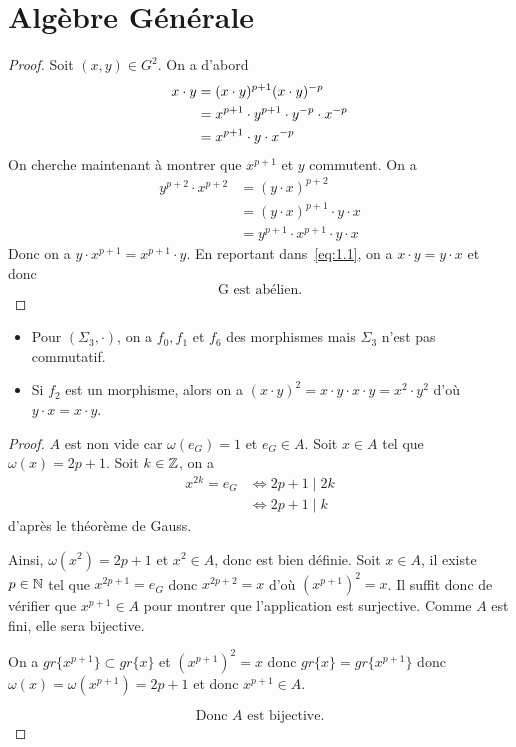 \section{Algèbre Générale}

\begin{proof}
	Soit $(x,y)\in G^{2}$. On a d'abord
	\begin{align}
		x\cdot y
		&=(x\cdot y)^{p+1}(x\cdot y)^{-p} \notag \\
		&=x^{p+1}\cdot y^{p+1}\cdot y^{-p}\cdot x^{-p}\notag \\
		&=x^{p+1}\cdot y \cdot x^{-p} \label{eq:1.1}
	\end{align}
	On cherche maintenant à montrer que $x^{p+1}$ et $y$ commutent.
	On a
	\begin{align}
		y^{p+2}\cdot x^{p+2}
		&=(y\cdot x)^{p+2}\\
		&=(y\cdot x)^{p+1}\cdot y\cdot x\\
		&=y^{p+1}\cdot x^{p+1}\cdot y\cdot x
	\end{align}
	Donc on a $y\cdot x^{p+1}=x^{p+1}\cdot y$. En reportant dans~\eqref{eq:1.1}, on a $x\cdot y=y\cdot x$ et donc 
	\begin{equation}
		\boxed{\text{G est abélien.}}
	\end{equation}
\end{proof}

\begin{remark}
	\phantom{}
	\begin{itemize}
		\item Pour $(\Sigma_{3},\cdot)$, on a $f_{0},f_{1}$ et $f_{6}$ des morphismes mais $\Sigma_{3}$ n'est pas commutatif.
		\item Si $f_{2}$ est un morphisme, alors on a $(x\cdot y)^{2}=x\cdot y\cdot x\cdot y=x^{2}\cdot y^{2}$ d'où $y\cdot x=x\cdot y$.
	\end{itemize}
\end{remark}

\begin{proof}
	$A$ est non vide car $\omega(e_{G})=1$ et $e_{G}\in A$. Soit $x\in A$ tel que $\omega(x)=2p+1$. Soit $k\in\mathbb{Z}$, on a 
	\begin{align}
		x^{2k}=e_{G}
		&\Leftrightarrow 2p+1\mid 2k\\
		&\Leftrightarrow 2p+1\mid k
	\end{align}
	d'après le théorème de Gauss.

	Ainsi, $\omega(x^{2})=2p+1$ et $x^{2}\in A$, donc  est bien définie. Soit $x\in A$, il existe $p\in\mathbb{N}$ tel que $x^{2p+1}=e_{G}$ donc $x^{2p+2}=x$ d'où $(x^{p+1})^{2}=x$. Il suffit donc de vérifier que $x^{p+1}\in A$ pour montrer que l'application est surjective. Comme $A$ est fini, elle sera bijective.

	On a $gr\{x^{p+1}\}\subset gr\{x\}$ et $(x^{p+1})^{2}=x$ donc $gr\{x\}=gr\{x^{p+1}\}$ donc $\omega(x)=\omega(x^{p+1})=2p+1$ et donc $x^{p+1}\in A$.

	\begin{equation}
		\boxed{\text{Donc }A\text{ est bijective.}}
	\end{equation}
\end{proof}

